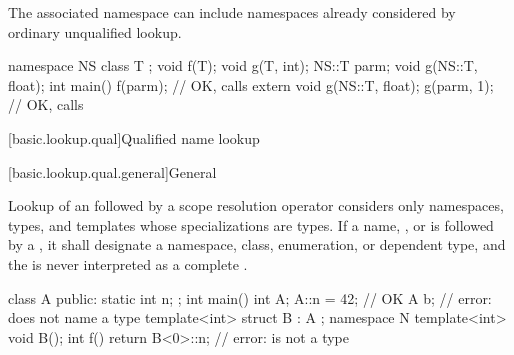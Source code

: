 \pnum
\begin{note}
The associated namespace can include namespaces
already considered by ordinary unqualified lookup.
\end{note}
\begin{example}
\begin{codeblock}
namespace NS {
  class T { };
  void f(T);
  void g(T, int);
}
NS::T parm;
void g(NS::T, float);
int main() {
  f(parm);                      // OK, calls 
  extern void g(NS::T, float);
  g(parm, 1);                   // OK, calls 
}
\end{codeblock}
\end{example}

[basic.lookup.qual]{Qualified name lookup}

[basic.lookup.qual.general]{General}

\pnum
{}%
%
%
Lookup of an 
followed by a \tcode{::} scope resolution operator
considers only
namespaces, types, and templates whose specializations are types.
If a name, , or 
is followed by a \tcode{::},
it shall designate a namespace, class, enumeration, or dependent type,
and the \tcode{::} is never interpreted as
a complete .
\begin{example}
\begin{codeblock}
class A {
public:
  static int n;
};
int main() {
  int A;
  A::n = 42;            // OK
  A b;                  // error:  does not name a type
}
template<int> struct B : A {};
namespace N {
  template<int> void B();
  int f() {
    return B<0>::n;     // error:  is not a type
  }
}
\end{codeblock}
\end{example}

%
%

